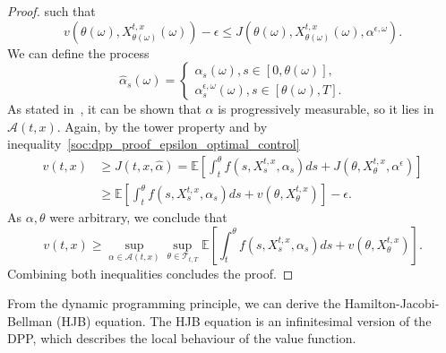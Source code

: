 \begin{proof}
    such that
\begin{equation}\label{soc:dpp_proof_epsilon_optimal_control}
    v(\theta(\omega), X^{t,x}_{\theta(\omega)}(\omega)) - \epsilon \leq J(\theta(\omega), X^{t,x}_{\theta(\omega)}(\omega), \alpha^{\epsilon, \omega}).
\end{equation}    
    We can define the process
\begin{equation*}
    \hat\alpha_s(\omega) = 
    \begin{cases}
        \alpha_s(\omega), s \in [0,\theta(\omega)],\\
        \alpha_s^{\epsilon, \omega}(\omega), s \in [\theta(\omega), T].
    \end{cases}
\end{equation*}
As stated in~\cite{pham2009continuous}, it can be shown that $\hat \alpha$ is progressively measurable,
so it lies in $\mathcal{A}(t,x)$.
Again, by the tower property and by inequality~\eqref{soc:dpp_proof_epsilon_optimal_control}
\begin{align*}
    v(t,x) &\geq J(t,x, \hat \alpha) = \mathbb{E}\left[ \int_t^\theta f(s,X^{t,x}_s, \alpha_s) ds + J(\theta, X^{t,x}_\theta, \alpha^\epsilon) \right] \\
            &\geq \mathbb{E}\left[ \int_t^\theta f(s,X^{t,x}_s, \alpha_s) ds + v(\theta, X^{t,x}_\theta) \right] - \epsilon.
\end{align*}
As $\alpha, \theta$ were arbitrary, we conclude that
\begin{equation}
    v(t,x) \geq \sup_{\alpha \in \mathcal{A}(t,x)} \sup_{\theta \in \mathcal{T}_{t,T}} \mathbb{E} \left[ \int_t^\theta f(s, X_s^{t,x}, \alpha_s) ds + v(\theta, X^{t,x}_\theta) \right].
\end{equation}
Combining both inequalities concludes the proof.
\end{proof}

From the dynamic programming principle, we can derive the Hamilton-Jacobi-Bellman (HJB)
equation. The HJB equation is an infinitesimal version of the DPP, which describes
the local behaviour of the value function.

